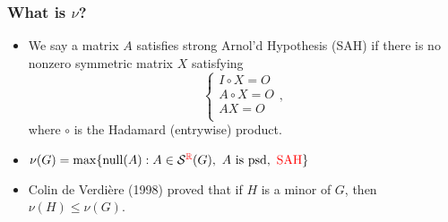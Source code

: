 \documentclass{beamer}
\def \nul {\operatorname{null}}
\begin{document}

\begin{frame}
\frametitle{What is $\nu$?}
\begin{itemize}
\item We say a matrix $A$ satisfies \alert{strong Arnol'd Hypothesis} (SAH) if there is \alert{no} nonzero symmetric matrix $X$ satisfying 
\[\left\{\begin{array}{l}I\circ X=O\\A\circ X=O\\ AX=O\\ \end{array}\right.,\]
where $\circ$ is the Hadamard (entrywise) product.
\item $\nu(G)=\max\{\nul(A):A\in\mathcal{S}^{\color{red} \mathbb{R}}(G),~A\text{ is psd},\text{ {\color{red} SAH}}\}$
\item Colin de Verdi\`ere (1998)\nocite{CdV2,HLS} proved  that if $H$ is a minor of $G$, then $\nu(H)\leq \nu(G)$.
\end{itemize}
\end{frame}

\end{document}
